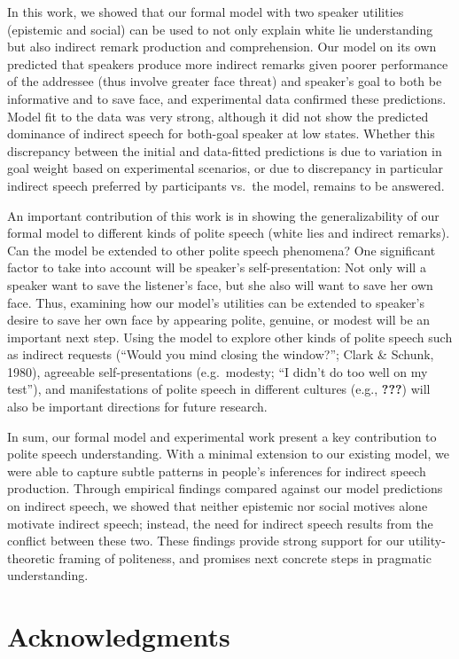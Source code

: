 \documentclass[10pt, letterpaper]{article}
\begin{document}
In this work, we showed that our formal model with two speaker utilities
(epistemic and social) can be used to not only explain white lie
understanding but also indirect remark production and comprehension. Our
model on its own predicted that speakers produce more indirect remarks
given poorer performance of the addressee (thus involve greater face
threat) and speaker's goal to both be informative and to save face, and
experimental data confirmed these predictions. Model fit to the data was
very strong, although it did not show the predicted dominance of
indirect speech for both-goal speaker at low states. Whether this
discrepancy between the initial and data-fitted predictions is due to
variation in goal weight based on experimental scenarios, or due to
discrepancy in particular indirect speech preferred by participants
vs.~the model, remains to be answered.

An important contribution of this work is in showing the
generalizability of our formal model to different kinds of polite speech
(white lies and indirect remarks). Can the model be extended to other
polite speech phenomena? One significant factor to take into account
will be speaker's self-presentation: Not only will a speaker want to
save the listener's face, but she also will want to save her own face.
Thus, examining how our model's utilities can be extended to speaker's
desire to save her own face by appearing polite, genuine, or modest will
be an important next step. Using the model to explore other kinds of
polite speech such as indirect requests (``Would you mind closing the
window?''; Clark \& Schunk, 1980), agreeable self-presentations
(e.g.~modesty; ``I didn't do too well on my test''), and manifestations
of polite speech in different cultures (e.g., {\textbf{???}}) will also
be important directions for future research.

In sum, our formal model and experimental work present a key
contribution to polite speech understanding. With a minimal extension to
our existing model, we were able to capture subtle patterns in people's
inferences for indirect speech production. Through empirical findings
compared against our model predictions on indirect speech, we showed
that neither epistemic nor social motives alone motivate indirect
speech; instead, the need for indirect speech results from the conflict
between these two. These findings provide strong support for our
utility-theoretic framing of politeness, and promises next concrete
steps in pragmatic understanding.

\section{Acknowledgments}\label{acknowledgments}
\end{document}
